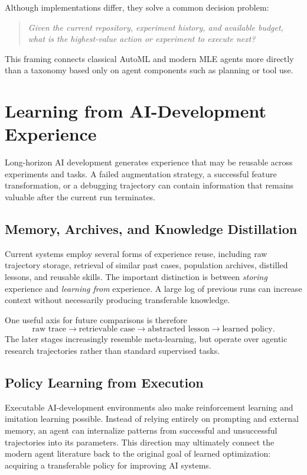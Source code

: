 \documentclass[journal]{IEEEtran}
\begin{document}
Although implementations differ, they solve a common decision problem:
\begin{quote}
\emph{Given the current repository, experiment history, and available budget, what is the highest-value action or experiment to execute next?}
\end{quote}
This framing connects classical AutoML and modern MLE agents more directly than a taxonomy based only on agent components such as planning or tool use.

\section{Learning from AI-Development Experience}
\label{sec:experience}

Long-horizon AI development generates experience that may be reusable across experiments and tasks. A failed augmentation strategy, a successful feature transformation, or a debugging trajectory can contain information that remains valuable after the current run terminates.

\subsection{Memory, Archives, and Knowledge Distillation}
Current systems employ several forms of experience reuse, including raw trajectory storage, retrieval of similar past cases, population archives, distilled lessons, and reusable skills. The important distinction is between \emph{storing} experience and \emph{learning from} experience. A large log of previous runs can increase context without necessarily producing transferable knowledge.

One useful axis for future comparisons is therefore
\begin{equation*}
\text{raw trace} \rightarrow \text{retrievable case} \rightarrow \text{abstracted lesson} \rightarrow \text{learned policy}.
\end{equation*}
The later stages increasingly resemble meta-learning, but operate over agentic research trajectories rather than standard supervised tasks.

\subsection{Policy Learning from Execution}
Executable AI-development environments also make reinforcement learning and imitation learning possible. Instead of relying entirely on prompting and external memory, an agent can internalize patterns from successful and unsuccessful trajectories into its parameters. This direction may ultimately connect the modern agent literature back to the original goal of learned optimization: acquiring a transferable policy for improving AI systems.
\end{document}
